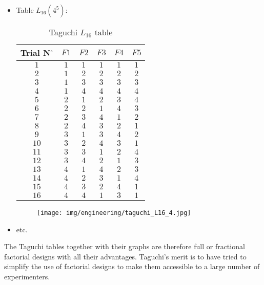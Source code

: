 \begin{itemize}
		\item Table $L_{16} (4^5)$:
		\begin{table}[H]\centering
			\begin{center}
			\begin{tabular}{|c|c|c|c|c|c|}
			\hline
			\multicolumn{1}{c}{\cellcolor{black!30}\textbf{Trial N${}^\circ$}} & 
			\multicolumn{1}{c}{\cellcolor{black!30}$F1$} & 
			\multicolumn{1}{c}{\cellcolor{black!30}$F2$} & 
			\multicolumn{1}{c}{\cellcolor{black!30}$F3$} & 
			\multicolumn{1}{c}{\cellcolor{black!30}$F4$} & 
			\multicolumn{1}{c}{\cellcolor{black!30}$F5$} \\ \hline
		  	$1$ & $1$ & $1$ & $1$ & $1$ & $1$\\ \hline
		  	$2$ & $1$ & $2$ & $2$ & $2$ & $2$\\ \hline
		  	$3$ & $1$ & $3$ & $3$ & $3$ & $3$\\ \hline
		  	$4$ & $1$ & $4$ & $4$ & $4$ & $4$\\ \hline
		  	$5$ & $2$ & $1$ & $2$ & $3$ & $4$\\ \hline
		  	$6$ & $2$ & $2$ & $1$ & $4$ & $3$\\ \hline
		  	$7$ & $2$ & $3$ & $4$ & $1$ & $2$\\ \hline
		  	$8$ & $2$ & $4$ & $3$ & $2$ & $1$\\ \hline
		  	$9$ & $3$ & $1$ & $3$ & $4$ & $2$\\ \hline
		  	$10$ & $3$ & $2$ & $4$ & $3$ & $1$\\ \hline
		  	$11$ & $3$ & $3$ & $1$ & $2$ & $4$\\ \hline
		  	$12$ & $3$ & $4$ & $2$ & $1$ & $3$\\ \hline
		  	$13$ & $4$ & $1$ & $4$ & $2$ & $3$\\ \hline
		  	$14$ & $4$ & $2$ & $3$ & $1$ & $4$\\ \hline
		  	$15$ & $4$ & $3$ & $2$ & $4$ & $1$\\ \hline
		  	$16$ & $4$ & $4$ & $1$ & $3$ & $1$\\ \hline
		 		\end{tabular}
			\end{center}
			\caption{Taguchi $L_{16}$ table}
		\end{table}		
		\begin{figure}[H]
			\begin{center}
			\texttt{[image: img/engineering/taguchi\_L16\_4.jpg]}
			\end{center}	
		\end{figure}
		
		\item etc.
	\end{itemize}
	The Taguchi tables together with their graphs are therefore full or fractional factorial designs with all their advantages. Taguchi's merit is to have tried to simplify the use of factorial designs to make them accessible to a large number of experimenters. 
	
